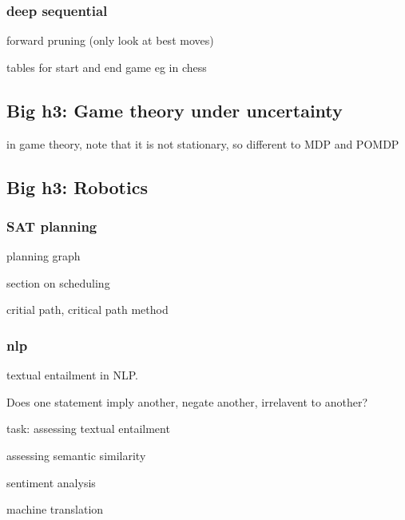 \subsubsection{deep sequential}
forward pruning (only look at best moves)

tables for start and end game eg in chess
\subsection{Big h3: Game theory under uncertainty}
in game theory, note that it is not stationary, so different to MDP and POMDP
\subsection{Big h3: Robotics}
\subsubsection{SAT planning}
planning graph

section on scheduling

critial path, critical path method
\subsubsection{nlp}
textual entailment in NLP.

Does one statement imply another, negate another, irrelavent to another?

task: assessing textual entailment

assessing semantic similarity

sentiment analysis

machine translation

